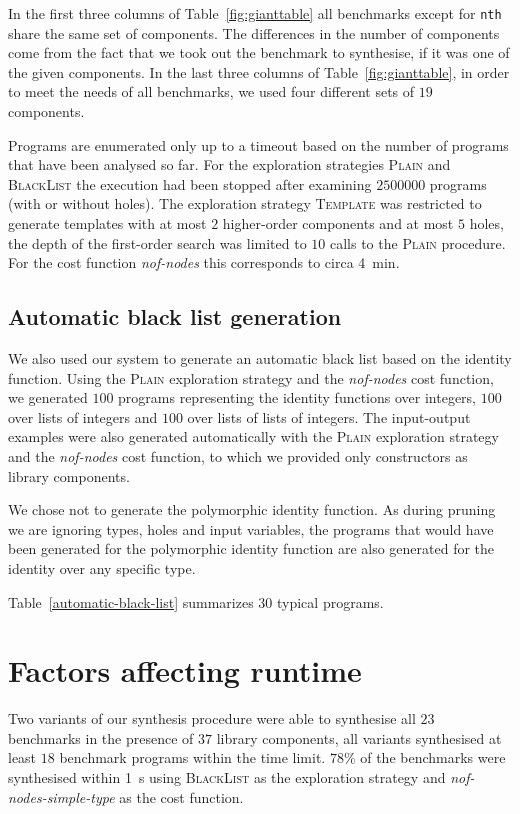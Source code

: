 In the first three columns of Table~\ref{fig:gianttable} all benchmarks except for \lstinline?nth? share the same set of components. The differences in the number of components come from the fact that we took out the benchmark to synthesise, if it was one of the given components.
In the last three columns of Table~\ref{fig:gianttable}, in order to meet the needs of all benchmarks, we used four different sets of $19$ components.

Programs are enumerated only up to a timeout based on the number of programs that have been analysed so far. For the exploration strategies \textsc{Plain} and \textsc{BlackList} the execution had been stopped after examining $2500000$ programs (with or without holes). The exploration strategy \textsc{Template} was restricted to generate templates with at most $2$ higher-order components and at most $5$ holes, the depth of the first-order search was limited to $10$ calls to the \textsc{Plain} procedure. For the cost function \textit{nof-nodes} this corresponds to circa \SI{4}{min}.


\subsection{Automatic black list generation}\label{Black list generation}
We also used our system to generate an automatic black list based on the identity function. Using the \textsc{Plain} exploration strategy and the \textit{nof-nodes} cost function, we generated $100$ programs representing the identity functions over integers, $100$ over lists of integers and $100$ over lists of lists of integers. The input-output examples were also generated automatically with the \textsc{Plain} exploration strategy and the \textit{nof-nodes} cost function, to which we provided only constructors as library components.

We chose not to generate the polymorphic identity function. As during pruning we are ignoring types, holes and input variables, the programs that would have been generated for the polymorphic identity function are also generated for the identity over any specific type.

Table~\ref{automatic-black-list} summarizes $30$ typical programs.


\section{Factors affecting runtime}\label{Factors affecting runtime}
Two variants of our synthesis procedure were able to synthesise all $23$ benchmarks in the presence of $37$ library components, all variants synthesised at least $18$ benchmark programs within the time limit. $78\%$ of the benchmarks were synthesised within \SI{1}{s} using \textsc{BlackList} as the exploration strategy and \textit{nof-nodes-simple-type} as the cost function.

